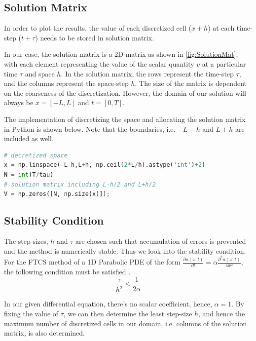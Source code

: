 \figBorderDD

\subsection{Solution Matrix}
In order to plot the results, the value of each discretized cell ($x+h$) at each time-step ($t+\tau$) needs to be stored in solution matrix.

In our case, the solution matrix is a 2D matrix as shown in \autoref{fig:SolutionMat}, with each element representing the value of the scalar quantity $v$ at a particular time $\tau$ and space $h$. In the solution matrix, the rows represent the time-step $\tau$, and the columns represent the space-step $h$. The size of the matrix is dependent on the coarseness of the discretization. However, the domain of our solution will always be $x=[-L,L]$ and $t=[0,T]$.

\figSolutionMat

The implementation of discretizing the space and allocating the solution matrix in Python is shown below. Note that the boundaries, i.e. $-L-h$ and $L+h$ are included as well.

\begin{lstlisting}[language=Python]
# decretized space
x = np.linspace(-L-h,L+h, np.ceil(2*L/h).astype('int')+2)
N = int(T/tau)
# solution matrix including L-h/2 and L+h/2
V = np.zeros([N, np.size(x)]);
\end{lstlisting}

\subsection{Stability Condition}
The step-sizes, $h$ and $\tau$ are chosen such that accumulation of errors is prevented and the method is numerically stable. Thus we look into the stability condition. For the FTCS method of a 1D Parabolic PDE of the form $\frac{\partial u(x, t)}{\partial t} = \alpha \frac{\partial^2 u(x, t)}{\partial x^2}$, the following condition must be satisfied \cite{griffiths}.
\begin{equation}
    \dfrac{\tau}{h^2} \leq \dfrac{1}{2 \alpha}
    \label{eq:Stabilitycondition}
\end{equation}

In our given differential equation, there's no scalar coefficient, hence, $\alpha=1$. By fixing the value of $\tau$, we can then determine the least step-size $h$, and hence the maximum number of discretized cells in our domain, i.e. columns of the solution matrix, is also determined.

